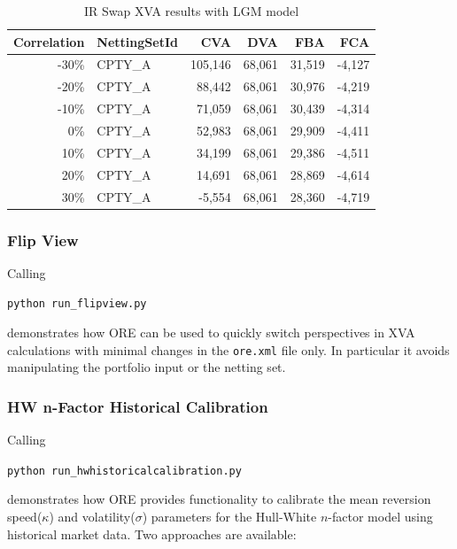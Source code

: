 \begin{table}[hbt]
\scriptsize
\begin{center}
\begin{tabular}{|r|l|r|r|r|r|}
\hline
Correlation & NettingSetId & CVA & DVA & FBA & FCA \\
\hline
 -30\%  &  CPTY\_A  & 105,146  &  68,061  &  31,519  &  -4,127 \\
 -20\%  &  CPTY\_A  &  88,442  &  68,061  &  30,976  &  -4,219 \\
 -10\%  &  CPTY\_A  &  71,059  &  68,061  &  30,439  &  -4,314 \\
   0\%  &  CPTY\_A  &  52,983  &  68,061  &  29,909  &  -4,411 \\
  10\%  &  CPTY\_A  &  34,199  &  68,061  &  29,386  &  -4,511 \\
  20\%  &  CPTY\_A  &  14,691  &  68,061  &  28,869  &  -4,614 \\
  30\%  &  CPTY\_A  &  -5,554  &  68,061  &  28,360  &  -4,719 \\
\hline
\end{tabular}
\caption{IR Swap XVA results with LGM model}
\end{center}
\end{table}

\subsubsection{Flip View}\label{example:exposure_flipview}

Calling

\medskip
\centerline{\tt python run\_flipview.py }
\medskip

demonstrates how ORE can be used to quickly switch perspectives in XVA calculations with minimal changes in the {\tt ore.xml}
file only. In particular it avoids manipulating the portfolio input or the netting set.

\subsubsection{HW n-Factor Historical Calibration}\label{example:exposure_hwhistoricalcalibration}

Calling

\medskip
\centerline{\tt python run\_hwhistoricalcalibration.py }
\medskip

demonstrates how ORE provides functionality to calibrate the mean reversion speed($\kappa$) and volatility($\sigma$) parameters for the Hull-White $n$-factor model using historical market data. Two approaches are available:

